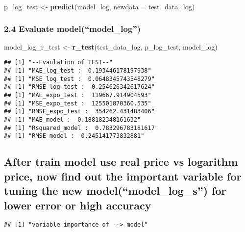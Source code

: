 \documentclass[
]{article}
\newenvironment{Shaded}{\begin{snugshade}}{\end{snugshade}}
\newcommand{\AttributeTok}[1]{\textcolor[rgb]{0.13,0.29,0.53}{#1}}
\newcommand{\FunctionTok}[1]{\textcolor[rgb]{0.13,0.29,0.53}{\textbf{#1}}}
\newcommand{\NormalTok}[1]{#1}
\newcommand{\OtherTok}[1]{\textcolor[rgb]{0.56,0.35,0.01}{#1}}
\begin{document}
\begin{Shaded}
\begin{Highlighting}[]
\NormalTok{p\_log\_test }\OtherTok{\textless{}{-}} \FunctionTok{predict}\NormalTok{(model\_log, }\AttributeTok{newdata =}\NormalTok{ test\_data\_log)}
\end{Highlighting}
\end{Shaded}

\hypertarget{evaluate-modelmodel_log}{%
\subsubsection{2.4 Evaluate
model(``model\_log'')}\label{evaluate-modelmodel_log}}

\begin{Shaded}
\begin{Highlighting}[]
\NormalTok{model\_log\_r\_test }\OtherTok{\textless{}{-}} \FunctionTok{r\_test}\NormalTok{(test\_data\_log, p\_log\_test, model\_log)}
\end{Highlighting}
\end{Shaded}

\begin{verbatim}
## [1] "--Evaulation of TEST--"
## [1] "MAE_log_test :  0.193446178197938"
## [1] "MSE_log_test :  0.0648345743548279"
## [1] "RMSE_log_test :  0.254626342617624"
## [1] "MAE_expo_test :  119667.914904593"
## [1] "MSE_expo_test :  125501870360.535"
## [1] "RMSE_expo_test :  354262.431483406"
## [1] "MAE_model :  0.188182348161632"
## [1] "Rsquared_model :  0.783296783181617"
## [1] "RMSE_model :  0.245141773832881"
\end{verbatim}

\hypertarget{after-train-model-use-real-price-vs-logarithm-price-now-find-out-the-important-variable-for-tuning-the-new-modelmodel_log_s-for-lower-error-or-high-accuracy}{%
\subsection{After train model use real price vs logarithm price, now
find out the important variable for tuning the new
model(``model\_log\_s'') for lower error or high
accuracy}\label{after-train-model-use-real-price-vs-logarithm-price-now-find-out-the-important-variable-for-tuning-the-new-modelmodel_log_s-for-lower-error-or-high-accuracy}}

\begin{verbatim}
## [1] "variable importance of --> model"
\end{verbatim}
\end{document}
